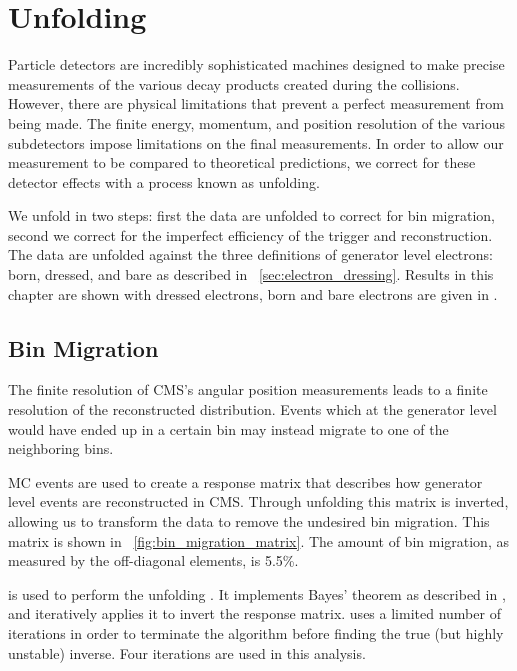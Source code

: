 \chapter{Unfolding}
\label{chatper:unfolding}

Particle detectors are incredibly sophisticated machines designed to make
precise measurements of the various decay products created during the
collisions. However, there are physical limitations that prevent a perfect
measurement from being made. The finite energy, momentum, and position
resolution of the various subdetectors impose limitations on the final
measurements. In order to allow our measurement to be compared to theoretical
predictions, we correct for these detector effects with a process known as
unfolding.

We unfold in two steps: first the data are unfolded to correct for bin
migration, second we correct for the imperfect efficiency of the trigger and
reconstruction. The data are unfolded against the three definitions of
generator level electrons: born, dressed, and bare as described in
\SEC~\ref{sec:electron_dressing}. Results in this chapter are shown with
dressed electrons, born and bare electrons are given in \APP{}.

\section{Bin Migration}
\label{sec:bin_migration}

The finite resolution of CMS's angular position measurements leads to a finite
resolution of the reconstructed \phistar distribution. Events which at the
generator level would have ended up in a certain \phistar bin may instead
migrate to one of the neighboring bins.

MC events are used to create a response matrix that describes how generator
level events are reconstructed in CMS. Through unfolding this matrix is
inverted, allowing us to transform the data to remove the undesired bin
migration. This matrix is shown in \FIG~\ref{fig:bin_migration_matrix}. The
amount of bin migration, as measured by the off-diagonal elements, is 5.5\%.


\RooUnfold is used to perform the unfolding \cite{adye_2011}. It implements
Bayes' theorem as described in \cite{dagostini_1995}, and iteratively applies
it to invert the response matrix. \RooUnfold uses a limited number of
iterations in order to terminate the algorithm before finding the true (but
highly unstable) inverse. Four iterations are used in this analysis.

